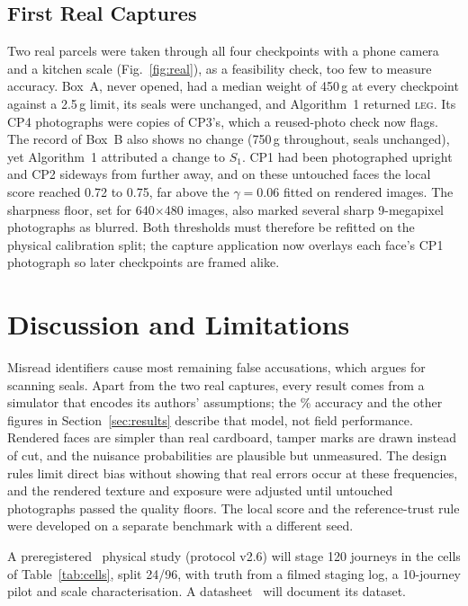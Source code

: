 \documentclass[conference]{IEEEtran}
\newcommand{\LEG}{\textsc{leg}}
\begin{document}
\subsection{First Real Captures}
\label{sec:real}
Two real parcels were taken through all four checkpoints with a phone camera and a kitchen scale (Fig.~\ref{fig:real}), as a feasibility check, too few to measure accuracy. Box~A, never opened, had a median weight of 450\,g at every checkpoint against a 2.5\,g limit, its seals were unchanged, and Algorithm~1 returned \LEG. Its CP4 photographs were copies of CP3's, which a reused-photo check now flags. The record of Box~B also shows no change (750\,g throughout, seals unchanged), yet Algorithm~1 attributed a change to $S_1$. CP1 had been photographed upright and CP2 sideways from further away, and on these untouched faces the local score reached 0.72 to 0.75, far above the $\gamma=0.06$ fitted on rendered images. The sharpness floor, set for 640$\times$480 images, also marked several sharp 9-megapixel photographs as blurred. Both thresholds must therefore be refitted on the physical calibration split; the capture application now overlays each face's CP1 photograph so later checkpoints are framed alike.

\section{Discussion and Limitations}\label{sec:disc}
Misread identifiers cause most remaining false accusations, which argues for scanning seals. Apart from the two real captures, every result comes from a simulator that encodes its authors' assumptions; the \AlgAcc\% accuracy and the other figures in Section~\ref{sec:results} describe that model, not field performance. Rendered faces are simpler than real cardboard, tamper marks are drawn instead of cut, and the nuisance probabilities are plausible but unmeasured. The design rules limit direct bias without showing that real errors occur at these frequencies, and the rendered texture and exposure were adjusted until untouched photographs passed the quality floors. The local score and the reference-trust rule were developed on a separate benchmark with a different seed.

A preregistered~\cite{nosek} physical study (protocol v2.6) will stage 120 journeys in the cells of Table~\ref{tab:cells}, split 24/96, with truth from a filmed staging log, a 10-journey pilot and scale characterisation. A datasheet~\cite{gebru} will document its dataset.
\end{document}
